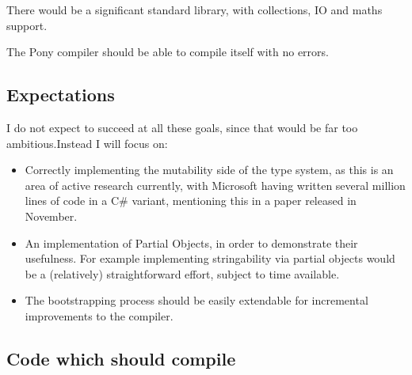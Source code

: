 \documentclass{article}
\begin{document}
There would be a significant standard library, with collections, IO and maths
support.

The Pony compiler should be able to compile itself with no errors.

\subsection{Expectations}

I do not expect to succeed at all these goals, since that would be far too
ambitious.Instead I will focus on:
\begin{itemize}
\item Correctly implementing the mutability side of
	the type system, as this is an area of active research currently, with
	Microsoft	having written several million lines of code in a C\# variant,
	mentioning this in a paper released in November\cite{microsoft2012}.

\item An implementation of Partial Objects, in order to demonstrate their 
	usefulness. For example implementing stringability via partial objects
	would be a (relatively) straightforward effort, subject to time available.

\item The bootstrapping process should be easily extendable for incremental
	 improvements to the compiler.
\end{itemize}

\subsection{Code which should compile}
\end{document}
